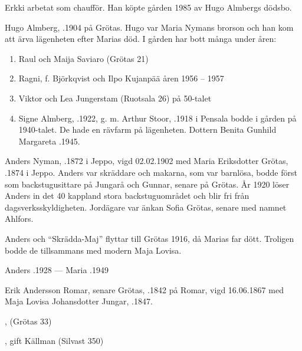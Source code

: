 Erkki arbetat som chaufför. Han köpte gården 1985 av Hugo Almbergs dödsbo.


%
Hugo Almberg, .1904 på Grötas. Hugo var Maria Nymans brorson och han kom att ärva lägenheten efter Marias död. I gården har bott många  under åren:
\begin{enumerate}
  \item Raul och Maija Saviaro (Grötas  21)
  \item Ragni, f. Björkqvist och Ilpo Kujanpää åren 1956 – 1957
  \item Viktor och Lea Jungerstam (Ruotsala 26) på 50-talet
  \item Signe Almberg, .1922, g. m. Arthur Stoor, .1918  i Pensala bodde i gården på 1940-talet. De hade en rävfarm på lägenheten. Dottern Benita Gunhild Margareta .1945.
\end{enumerate}


%
Anders Nyman, .1872 i Jeppo, vigd 02.02.1902 med Maria Eriksdotter Grötas, .1874 i Jeppo. Anders var skräddare och makarna, som var barnlösa, bodde först som backstugusittare på Jungarå och Gunnar, senare på Grötas. År 1920 löser Anders in det 40 kappland stora backstuguområdet och blir fri från dagsverksskyldigheten. Jordägare var änkan Sofia Grötas, senare  med namnet Ahlfors.

Anders och ``Skrädda-Maj'' flyttar till Grötas 1916, då Marias far dött. Troligen bodde de tillsammans med modern Maja Lovisa.

Anders .1928  ---  Maria .1949


%
Erik Andersson Romar, senare Grötas, .1842 på Romar, vigd 16.06.1867 med Maja Lovisa Johansdotter Jungar, .1847.
\begin{jhchildren}
  \item {}, (Grötas 33)
  \item {}
  \item {}, gift Källman (Silvast 350)
\end{jhchildren}

